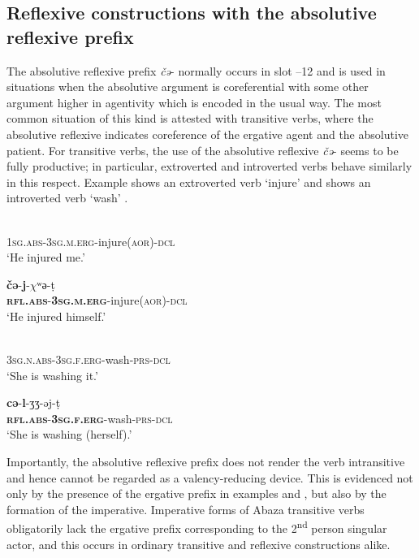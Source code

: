 \documentclass[output=paper]{langscibook}
\begin{document}
\subsection{Reflexive constructions with the absolutive reflexive prefix}\label{sec:Arkadiev:2.1}



The absolutive reflexive prefix \textit{č{ə}}{}- normally occurs in slot –12 and is used in situations when the absolutive argument is coreferential with some other argument higher in agentivity which is encoded in the usual way. The most common situation of this kind is attested with transitive verbs, where the absolutive reflexive indicates coreference of the ergative agent and the absolutive patient. For transitive verbs, the use of the absolutive reflexive \textit{č{ə}}{}- seems to be fully productive; in particular, extroverted and introverted verbs behave similarly in this respect. Example  shows an extroverted verb ‘injure’ and  shows an introverted verb ‘wash’ .


\ea 
\label{ex:Arkadiev:15}
    \ea 
    \label{ex:Arkadiev:15a}
    \\
     \textsc{1sg.abs-3sg.m.erg}{}-injure\textsc{(aor)-dcl}\\
    \glt  ‘He injured me.’
    
    \ex 
    \label{ex:Arkadiev:15b}
    \gll  \textbf{{č{ə}}}{{}-}\textbf{{j}}{{}-$\chi {ʷ}{ə}$-t{̣}}\\
    \textbf{\textsc{rfl.abs}}\textsc{{}-}\textbf{\textsc{3sg.m.erg}}\textsc{{}-}injure(\textsc{aor)-dcl}\\
    \glt ‘He injured himself.’
    \z
\z

\ea 
\label{ex:Arkadiev:16}
    \ea 
    \label{ex:Arkadiev:16a}
    \\
       \textsc{3sg.n.abs-3sg.f.erg}{}-wash-\textsc{prs-dcl}\\
    \glt  ‘She is washing it.’
    
    \ex 
    \label{ex:Arkadiev:16b}
    \gll  \textbf{{c{ə}}}{{}-}\textbf{{l}}{{}-{ʒ}{ʒ}{}-{ə}j-t{̣}}\\
    \textbf{\textsc{rfl.abs}}\textsc{{}-}\textbf{\textsc{3sg.f.erg}}{}-wash-\textsc{prs-dcl}\\
    \glt  ‘She is washing (herself).’
    \z
    
\z
 
 
Importantly, the absolutive reflexive prefix does not render the verb intransitive and hence cannot be regarded as a valency-reducing device. This is evidenced not only by the presence of the ergative prefix in examples  and , but also by the formation of the imperative. Imperative forms of Abaza transitive verbs obligatorily lack the ergative prefix corresponding to the 2\textsuperscript{nd} person singular actor, and this occurs in ordinary transitive  and reflexive  constructions alike.
\end{document}
